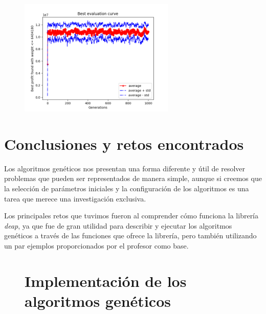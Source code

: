 \documentclass[sigconf,authorversion,nonacm]{acmart}
\begin{document}
\begin{figure}[H]
  \centering
  \includegraphics[width=210pt]{comma.png}
\end{figure}


\section{Conclusiones y retos encontrados}
Los algoritmos genéticos nos presentan una forma diferente y útil de resolver problemas que pueden ser representados de manera simple, aunque si creemos que la selección de parámetros iniciales y la configuración de los algoritmos es una tarea que merece una investigación exclusiva.

Los principales retos que tuvimos fueron al comprender cómo funciona la librería \textit{deap}, ya que fue de gran utilidad para describir y ejecutar los algoritmos genéticos a través de las funciones que ofrece la librería, pero también utilizando un par ejemplos proporcionados por el profesor como base.





\clearpage

\appendix

\begin{figure}
  \section{Implementación de los algoritmos genéticos}
  \label{app:py}
  \inputminted[lastline=44]{python}{/home/mario/git/MarioJim/PracticasInteligenciaComp/4_AlgoritmosGeneticos/A01173359_A01252642_T4.py}
\end{figure}

\begin{figure}
  \inputminted[firstline=46]{python}{/home/mario/git/MarioJim/PracticasInteligenciaComp/4_AlgoritmosGeneticos/A01173359_A01252642_T4.py}
\end{figure}
\end{document}
